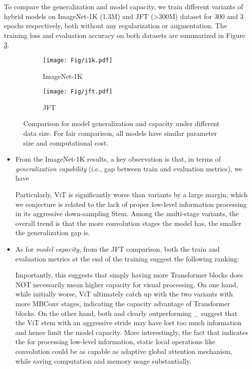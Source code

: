 \documentclass{article}
\begin{document}
To compare the generalization and model capacity, we train different variants of hybrid models on ImageNet-1K (1.3M) and JFT (>300M) dataset for 300 and 3 epochs respectively, both without any regularization or augmentation. The training loss and evaluation accuracy on both datasets are summarized in Figure \ref{fig:verticle_layout}.
\begin{figure}[!ht]
    \centering
    \begin{subfigure}[b]{0.5\textwidth}
        \centering
        \texttt{[image: Fig/i1k.pdf]}
        \caption{ImageNet-1K}
        \label{fig:i1k}
    \end{subfigure}\begin{subfigure}[b]{0.5\textwidth}
        \centering
        \texttt{[image: Fig/jft.pdf]}
        \caption{JFT}
        \label{fig:jft}
    \end{subfigure}
    \caption{Comparison for model generalization and capacity under different data size. For fair comparison, all models have similar parameter size and computational cost.}
    \label{fig:verticle_layout}
\end{figure}
\begin{itemize}[leftmargin=*,itemsep=0pt,topsep=0pt,partopsep=0pt]
\item From the ImageNet-1K results, a key observation is that, in terms of \textit{generalization capability} (i.e., gap between train and evaluation metrics), we have

Particularly, \textsc{ViT} is significantly worse than variants by a large margin, which we conjecture is related to the lack of proper low-level information processing in its aggressive down-sampling Stem.
Among the multi-stage variants, the overall trend is that the more convolution stages the model has, the smaller the generalization gap is.

\item As for \textit{model capacity}, from the JFT comparison, both the train and evaluation metrics at the end of the training suggest the following ranking:

Importantly, this suggests that simply having more Transformer blocks does NOT necessarily mean higher capacity for visual processing.
On one hand, while initially worse, \textsc{ViT} ultimately catch up with the two variants with more MBConv stages, indicating the capacity advantage of Transformer blocks.
On the other hand, both  and  clearly outperforming _ suggest that the ViT stem with an aggressive stride may have lost too much information and hence limit the model capacity.
More interestingly, the fact that  indicates the for processing low-level information, static local operations like convolution could be as capable as adaptive global attention mechanism, while saving computation and memory usage substantially.
\end{itemize}
\end{document}

